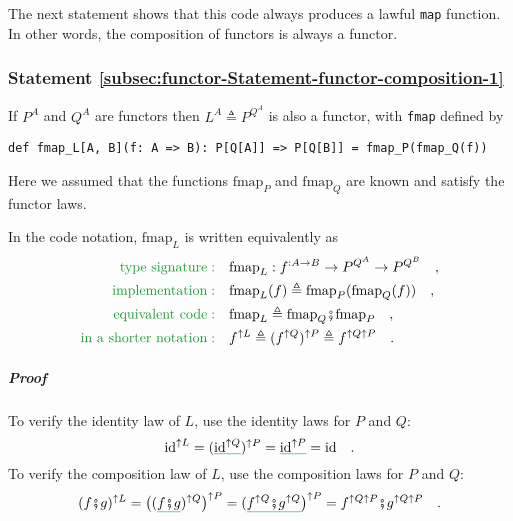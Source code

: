 The next statement shows that this code always produces a lawful \lstinline!map!
function. In other words, the composition
of functors is always a functor.

\subsubsection{Statement \label{subsec:functor-Statement-functor-composition-1}\ref{subsec:functor-Statement-functor-composition-1}}

If $P^{A}$ and $Q^{A}$ are functors then $L^{A}\triangleq P^{Q^{A}}$
is also a functor, with \lstinline!fmap! defined by
\begin{lstlisting}
def fmap_L[A, B](f: A => B): P[Q[A]] => P[Q[B]] = fmap_P(fmap_Q(f))
\end{lstlisting}
Here we assumed that the functions $\text{fmap}_{P}$ and $\text{fmap}_{Q}$
are known and satisfy the functor laws.

In the code notation, $\text{fmap}_{L}$ is written equivalently as
\begin{align}
{\color{greenunder}\text{type signature}:}\quad & \text{fmap}_{L}:f^{:A\rightarrow B}\rightarrow P^{Q^{A}}\rightarrow P^{Q^{B}}\quad,\nonumber \\
{\color{greenunder}\text{implementation}:}\quad & \text{fmap}_{L}(f)\triangleq\text{fmap}_{P}(\text{fmap}_{Q}(f))\quad,\nonumber \\
{\color{greenunder}\text{equivalent code}:}\quad & \text{fmap}_{L}\triangleq\text{fmap}_{Q}\bef\text{fmap}_{P}\quad,\\
{\color{greenunder}\text{in a shorter notation}:}\quad & f^{\uparrow L}\triangleq(f^{\uparrow Q})^{\uparrow P}\triangleq f^{\uparrow Q\uparrow P}\quad.\label{eq:def-functor-composition-fmap}
\end{align}


\subparagraph{Proof}

To verify the identity law of $L$, use the identity laws for $P$
and $Q$:
\[
\text{id}^{\uparrow L}=(\gunderline{\text{id}^{\uparrow Q}})^{\uparrow P}=\gunderline{\text{id}^{\uparrow P}}=\text{id}\quad.
\]
To verify the composition law of $L$, use the composition laws for
$P$ and $Q$:
\[
(f\bef g)^{\uparrow L}=\big((\gunderline{f\bef g})^{\uparrow Q}\big)^{\uparrow P}=(\gunderline{f^{\uparrow Q}\bef g^{\uparrow Q}}\big)^{\uparrow P}=f^{\uparrow Q\uparrow P}\bef g^{\uparrow Q\uparrow P}\quad.
\]

